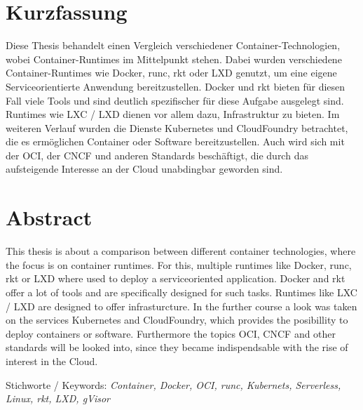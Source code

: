 
\chapter{Kurzfassung}
\label{chap:kurzfassung}

Diese Thesis behandelt einen Vergleich verschiedener Container-Technologien, wobei Container-Runtimes im Mittelpunkt stehen. Dabei wurden verschiedene Container-Runtimes wie Docker, runc, rkt oder LXD genutzt, um eine eigene Serviceorientierte Anwendung bereitzustellen. Docker und rkt bieten für diesen Fall viele Tools und sind deutlich spezifischer für diese Aufgabe ausgelegt sind. Runtimes wie LXC / LXD dienen vor allem dazu, Infrastruktur zu bieten. Im weiteren Verlauf wurden die Dienste Kubernetes und CloudFoundry betrachtet, die es ermöglichen Container oder Software bereitzustellen. Auch wird sich mit der OCI, der CNCF und anderen Standards beschäftigt, die durch das aufsteigende Interesse an der Cloud unabdingbar geworden sind.

\begingroup
\let\cleardoublepage\relax
\chapter{Abstract}
\label{chap:Abstract}

This thesis is about a comparison between different container technologies, where the focus is on container runtimes. For this, multiple runtimes like Docker, runc, rkt or LXD where used to deploy a serviceoriented application. Docker and rkt offer a lot of tools and are specifically designed for such tasks. Runtimes like LXC / LXD are designed to offer infrasturcture. In the further course a look was taken on the services Kubernetes and CloudFoundry, which provides the posibillity to deploy containers or software. Furthermore the topics OCI, CNCF and other standards will be looked into, since they became indispendsable with the rise of interest in the Cloud.

Stichworte / Keywords: \textit{Container, Docker, OCI, runc, Kubernets, Serverless, Linux, rkt, LXD, gVisor}
\endgroup